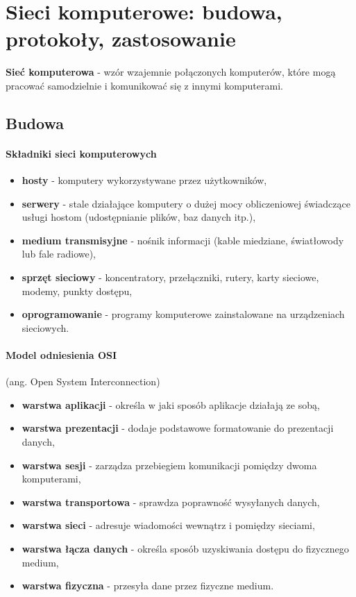 \documentclass[]{report}
\begin{document}
\section{Sieci komputerowe: budowa, protokoły, zastosowanie}
\textbf{Sieć komputerowa} - wzór wzajemnie połączonych komputerów, które mogą pracować samodzielnie i komunikować się z innymi komputerami.

\subsection{Budowa}

\paragraph{Składniki sieci komputerowych}
\begin{itemize}
\item \textbf{hosty} - komputery wykorzystywane przez użytkowników,
\item \textbf{serwery} - stale działające komputery o dużej mocy obliczeniowej świadczące usługi hostom (udostępnianie plików, baz danych itp.),
\item \textbf{medium transmisyjne} - nośnik informacji (kable miedziane, światłowody lub fale radiowe),
\item \textbf{sprzęt sieciowy} - koncentratory, przełączniki, rutery, karty sieciowe, modemy, punkty dostępu,
\item \textbf{oprogramowanie} - programy komputerowe zainstalowane na urządzeniach sieciowych.
\end{itemize}

\medskip
\paragraph{Model odniesienia OSI} (ang. Open System Interconnection) 
\begin{itemize}
\item \textbf{warstwa aplikacji} - określa w jaki sposób aplikacje działają ze sobą,
\item \textbf{warstwa prezentacji} - dodaje podstawowe formatowanie do prezentacji danych,
\item \textbf{warstwa sesji} - zarządza przebiegiem komunikacji pomiędzy dwoma komputerami,
\item \textbf{warstwa transportowa} - sprawdza poprawność wysyłanych danych,
\item \textbf{warstwa sieci} - adresuje wiadomości wewnątrz i pomiędzy sieciami,
\item \textbf{warstwa łącza danych} - określa sposób uzyskiwania dostępu do fizycznego medium,
\item \textbf{warstwa fizyczna} - przesyła dane przez fizyczne medium.
\end{itemize}
\end{document}
